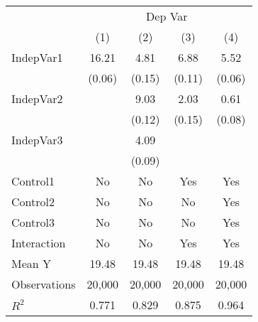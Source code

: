 \begin{tabular}{l cccc}
\toprule
& \multicolumn{4}{c}{Dep Var}  \\ \cmidrule(lr){2-5}
& (1) & (2) & (3) & (4)  \\ 
\midrule
IndepVar1           &       16.21\sym{***}&        4.81\sym{***}&        6.88\sym{***}&        5.52\sym{***}\\
                    &      (0.06)         &      (0.15)         &      (0.11)         &      (0.06)         \\
IndepVar2           &                     &        9.03\sym{***}&        2.03\sym{***}&        0.61\sym{***}\\
                    &                     &      (0.12)         &      (0.15)         &      (0.08)         \\
IndepVar3           &                     &        4.09\sym{***}&                     &                     \\
                    &                     &      (0.09)         &                     &                     \\
Control1            &          No         &          No         &         Yes         &         Yes         \\
Control2            &          No         &          No         &          No         &         Yes         \\
Control3            &          No         &          No         &          No         &         Yes         \\
Interaction         &          No         &          No         &         Yes         &         Yes         \\
\midrule
Mean Y              &       19.48         &       19.48         &       19.48         &       19.48         \\
Observations        &      20,000         &      20,000         &      20,000         &      20,000         \\
$ R^2 $             &       0.771         &       0.829         &       0.875         &       0.964         \\
\bottomrule
\end{tabular}